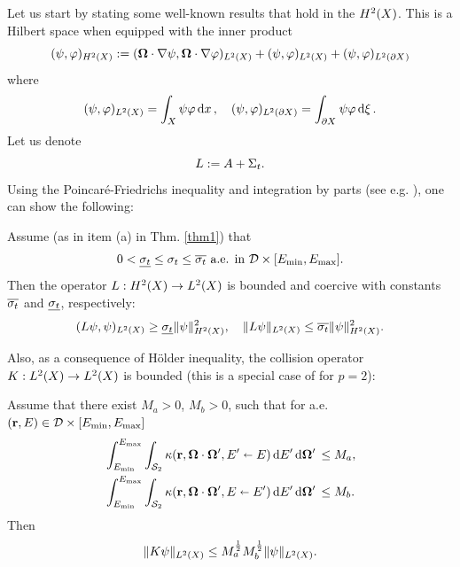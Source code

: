 {Let us start by stating some well-known results that hold in the $\Hp[2](X)$.
This is a Hilbert space when equipped with the inner product
$$
	\ip{\Hp[2](X)}{\psi,\varphi} := \ip{\Lp[2](X)}{\bomega\cdot\nabla \psi, \bomega\cdot\nabla \varphi} +
	\ip{\Lp[2](X)}{\psi,\varphi} +
	\ip{\Lp[2](\pX)}{\psi,\varphi} 
$$
where
\begin{equation}\label{eq:ipL2}
	\ip{\Lp[2](X)}{\psi,\varphi} = \int_X \psi \varphi \,\d{x},\quad
	\ip{\Lp[2](\pX)}{\psi,\varphi} = \int_{\pX} \psi \varphi \,\d{\xi}.
\end{equation}
Let us denote 
\begin{equation}\label{eq:opL}
	\op{L} := A + \Sigma_t.
\end{equation}
Using the Poincar{\' e}-Friedrichs inequality and integration by parts (see e.g. \cite[Chap.
2]{Agoshkov}), one can show the following:
\begin{lemma}\label{lem:Lcoercive}
	Assume (as in item (a) in Thm. \ref{thm1}) that 
	$$
		0 < \mst \leq \sigma_t \leq \Mst \ \text{a.e. in } \VV\times[\Emin,\Emax].
	$$
	Then the operator $\op{L} : \Hp[2](X) \to \Lp[2](X)$ is
	bounded and coercive with constants $\Mst$ and $\mst$, respectively: 
	$$
		\ip{\Lp[2](X)}{L\psi, \psi} \geq \mst \norm[{\Hp[2](X)}]{\psi}^2,\quad  \norm[{\Lp[2](X)}]{L\psi} \leq \Mst
		\norm[{\Hp[2](X)}]{\psi}^2.
	$$
\end{lemma}
Also, as a consequence of H\"older inequality, the collision operator
\linebreak[4]\mbox{$\op{K} :
\Lp[2](X) \to \Lp[2](X)$} is bounded (this is a special case of \cite[Lemma 1, \S 3, Chap. XXI]{DautrayLions} for $p =
2$):
\begin{lemma}\label{lem:Kbounded}
	Assume that there exist $M_a > 0$, $M_b > 0$, such that for a.e. $(\br,E) \in \VV\times[\Emin,\Emax]$
	$$
	\begin{aligned}
	&\int_{\Emin}^{\Emax}\int_{\Sphere} \kappa(\br,\bomega\cdot\bomega',
	    E'\sla E)\,\d{E'}\d{\bomega'} \leq M_a,\\
	&\int_{\Emin}^{\Emax}\int_{\Sphere} \kappa(\br,\bomega\cdot\bomega',
	    E\sla E')\,\d{E'}\d{\bomega'} \leq M_b.    
	\end{aligned}
	$$
	Then 
	$$
	\norm[{\Lp[2](X)}]{K\psi} \leq M_a^{\frac12} M_b^{\frac12} \norm[{\Lp[2](X)}]{\psi}.
	$$
\end{lemma}

}
